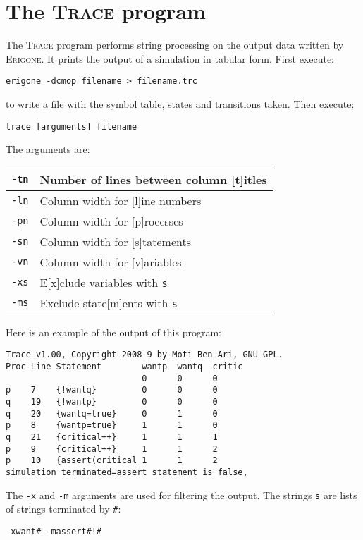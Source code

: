 \documentclass[11pt]{article}
\newcommand*{\prg}{\textsc{Erigone}}
\newcommand*{\trc}{\textsc{Trace}}
\newcommand*{\p}[1]{\texttt{#1}}
\begin{document}
\section{The \trc{} program}\label{s.trace}

The \trc{} program performs string processing on the output data written
by \prg{}. It prints the output of a simulation in tabular form. First
execute:
\begin{verbatim}
erigone -dcmop filename > filename.trc
\end{verbatim}
to write a file with the symbol table, states and transitions
taken. Then execute:
\begin{verbatim}
trace [arguments] filename
\end{verbatim}
The arguments are:
\begin{center}
\begin{tabular}{|l|l|}
\hline
\p{-tn} & Number of lines between column [t]itles\\\hline\hline
\p{-ln} & Column width for [l]ine numbers\\\hline
\p{-pn} & Column width for [p]rocesses\\\hline
\p{-sn} & Column width for [s]tatements\\\hline
\p{-vn} & Column width for [v]ariables\\\hline\hline
\p{-xs} & E[x]clude variables with \p{s}\\\hline
\p{-ms} & Exclude state[m]ents with \p{s}\\\hline
\end{tabular}
\end{center}
Here is an example of the output of this program:
\begin{footnotesize}
\begin{verbatim}
Trace v1.00, Copyright 2008-9 by Moti Ben-Ari, GNU GPL.
Proc Line Statement        wantp  wantq  critic 
                           0      0      0      
p    7    {!wantq}         0      0      0      
q    19   {!wantp}         0      0      0      
q    20   {wantq=true}     0      1      0      
p    8    {wantp=true}     1      1      0      
q    21   {critical++}     1      1      1      
p    9    {critical++}     1      1      2      
p    10   {assert(critical 1      1      2      
simulation terminated=assert statement is false,
\end{verbatim}
\end{footnotesize}

The \p{-x} and \p{-m} arguments are used for filtering the output.
The strings \p{s} are lists of strings terminated by \p{\#}:
\begin{verbatim}
-xwant# -massert#!#
\end{verbatim}
\end{document}
